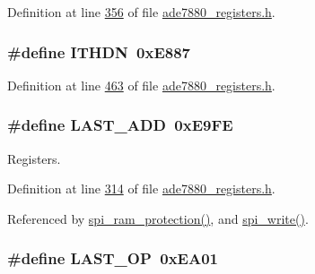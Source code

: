 Definition at line \hyperlink{a00036_source_l00356}{356} of file \hyperlink{a00036_source}{ade7880\-\_\-registers.\-h}.

\hypertarget{a00036_af451e4358c635504ffb96127fb87b003}{
\subsubsection[{I\-T\-H\-D\-N}]{\setlength{\rightskip}{0pt plus 5cm}\#define I\-T\-H\-D\-N~0x\-E887}}\label{de/d8c/a00036_af451e4358c635504ffb96127fb87b003}


Definition at line \hyperlink{a00036_source_l00463}{463} of file \hyperlink{a00036_source}{ade7880\-\_\-registers.\-h}.

\hypertarget{a00036_adab6c053c389db762442c88b7e32e543}{
\subsubsection[{L\-A\-S\-T\-\_\-\-A\-D\-D}]{\setlength{\rightskip}{0pt plus 5cm}\#define L\-A\-S\-T\-\_\-\-A\-D\-D~0x\-E9\-F\-E}}\label{de/d8c/a00036_adab6c053c389db762442c88b7e32e543}


Registers. 



Definition at line \hyperlink{a00036_source_l00314}{314} of file \hyperlink{a00036_source}{ade7880\-\_\-registers.\-h}.



Referenced by \hyperlink{a00040_source_l00343}{spi\-\_\-ram\-\_\-protection()}, and \hyperlink{a00040_source_l00221}{spi\-\_\-write()}.

\hypertarget{a00036_aed1301248abf6c26045727a190f6550a}{
\subsubsection[{L\-A\-S\-T\-\_\-\-O\-P}]{\setlength{\rightskip}{0pt plus 5cm}\#define L\-A\-S\-T\-\_\-\-O\-P~0x\-E\-A01}}\label{de/d8c/a00036_aed1301248abf6c26045727a190f6550a}


